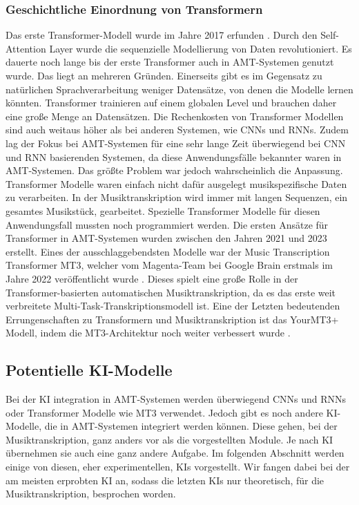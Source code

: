 \subsubsection{Geschichtliche Einordnung von Transformern}
Das erste Transformer-Modell wurde im Jahre 2017 erfunden \cite{vaswani2017attention}.
Durch den Self-Attention Layer wurde die sequenzielle Modellierung von Daten revolutioniert.
Es dauerte noch lange bis der erste Transformer auch in AMT-Systemen genutzt wurde.
Das liegt an mehreren Gründen.
Einerseits gibt es im Gegensatz zu natürlichen Sprachverarbeitung weniger Datensätze, von denen die Modelle lernen könnten.
Transformer trainieren auf einem globalen Level und brauchen daher eine große Menge an Datensätzen.
Die Rechenkosten von Transformer Modellen sind auch weitaus höher als bei anderen Systemen, wie CNNs und RNNs.
Zudem lag der Fokus bei AMT-Systemen für eine sehr lange Zeit überwiegend bei CNN und RNN basierenden Systemen,
da diese Anwendungsfälle bekannter waren in AMT-Systemen.
Das größte Problem war jedoch wahrscheinlich die Anpassung.
Transformer Modelle waren einfach nicht dafür ausgelegt musikspezifische Daten zu verarbeiten.
In der Musiktranskription wird immer mit langen Sequenzen, ein gesamtes Musikstück, gearbeitet.
Spezielle Transformer Modelle für diesen Anwendungsfall mussten noch programmiert werden.
Die ersten Ansätze für Transformer in AMT-Systemen wurden zwischen den Jahren 2021 und 2023 erstellt.
Eines der ausschlaggebendsten Modelle war der Music Transcription Transformer MT3,
welcher vom Magenta-Team bei Google Brain erstmals im Jahre 2022 veröffentlicht wurde \cite{gardner2021mt3}.
Dieses spielt eine große Rolle in der Transformer-basierten automatischen Musiktranskription,
da es das erste weit verbreitete Multi-Task-Transkriptionsmodell ist.
Eine der Letzten bedeutenden Errungenschaften zu Transformern und Musiktranskription ist das
YourMT3+ Modell, indem die MT3-Architektur noch weiter verbessert wurde \cite{chang2024yourmt3+}.

\subsection{Potentielle KI-Modelle}
Bei der KI integration in AMT-Systemen werden überwiegend CNNs und RNNs oder Transformer Modelle wie MT3 verwendet.
Jedoch gibt es noch andere KI-Modelle, die in AMT-Systemen integriert werden können.
Diese gehen, bei der Musiktranskription, ganz anders vor als die vorgestellten Module.
Je nach KI übernehmen sie auch eine ganz andere Aufgabe.
Im folgenden Abschnitt werden einige von diesen, eher experimentellen, KIs vorgestellt.
Wir fangen dabei bei der am meisten erprobten KI an,
sodass die letzten KIs nur theoretisch, für die Musiktranskription, besprochen worden.

